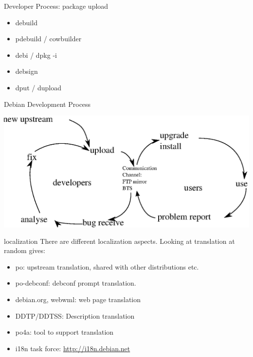 \documentclass[cjk,dvipdfm,12pt]{beamer}
\begin{document}
\begin{frame}{Developer Process: package upload}
\begin{itemize}
 \item debuild
 \item pdebuild / cowbuilder 
 \item debi / dpkg -i
 \item debsign
 \item dput / dupload
\end{itemize}
\end{frame}

\begin{frame}{Debian Development Process}

 \includegraphics[width=1\hsize]{image200805/develcycle.eps} 

\end{frame}

\begin{frame}{localization}
 There are different localization aspects. Looking at translation at
 random gives:
\begin{itemize}
 \item po: upstream translation, shared with other distributions etc.
 \item po-debconf: debconf prompt translation.
 \item debian.org, webwml: web page translation
 \item DDTP/DDTSS: Description translation
 \item po4a: tool to support translation
 \item i18n task force: \url{http://i18n.debian.net}
\end{itemize}
\end{frame}
\end{document}
